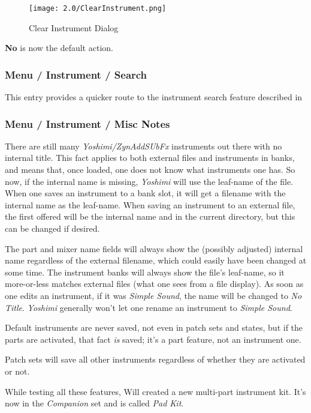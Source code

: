 \begin{figure}[H]
   \centering
   \texttt{[image: 2.0/ClearInstrument.png]}
   \caption{Clear Instrument Dialog}
   \label{fig:clear_instrument_dialog}
\end{figure}

   \textbf{No} is now the default action.

\subsubsection{Menu / Instrument / Search}
\label{subsubsec:menu_instrument_search}

   This entry provides a quicker route to the instrument search feature described
   in 
\subsubsection{Menu / Instrument / Misc Notes}
\label{subsubsec:menu_instrument_misc_notes}

   There are still many \textsl{Yoshimi/ZynAddSUbFx} instruments out there with
   no internal title. This fact applies to both external files and instruments
   in banks, and means that, once loaded, one does not know what instruments
   one has. So now, if the internal name is missing, \textsl{Yoshimi} will use
   the leaf-name of the file.  When one saves an instrument to a bank slot, it
   will get a filename with the internal name as the leaf-name.  When saving
   an instrument to an external file, the first offered will be the internal
   name and in the current directory, but this can be changed if desired.

   The part and mixer name fields will always show the (possibly adjusted)
   internal name regardless of the external filename, which could easily have
   been changed at some time.  The instrument banks will always show the file's
   leaf-name, so it more-or-less matches external files (what one sees from a
   file display).  As soon as one edits an instrument, if it was \textsl{Simple
   Sound}, the name will be changed to \textsl{No Title}.  \textsl{Yoshimi}
   generally won't let one rename an instrument to \textsl{Simple Sound}.

   Default instruments are never saved, not even in patch sets and states, but
   if the parts are activated, that fact \textsl{is} saved; it's a part
   feature, not an instrument one.

   Patch sets will save all other instruments regardless of whether they are
   activated or not.

   While testing all these features, Will created a new multi-part instrument
   kit.  It's now in the \textsl{Companion} set and is called \textsl{Pad Kit}.

